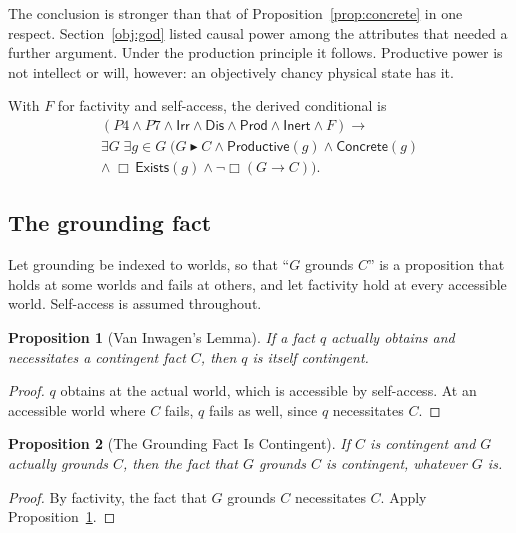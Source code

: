 \documentclass[11pt,letterpaper]{article}
\theoremstyle{plain}
\newtheorem{proposition}{Proposition}
\theoremstyle{definition}
\newcommand{\grounds}{\blacktriangleright}
\begin{document}
The conclusion is stronger than that of Proposition~\ref{prop:concrete} in one respect. Section~\ref{obj:god} listed causal power among the attributes that needed a further argument. Under the production principle it follows. Productive power is not intellect or will, however: an objectively chancy physical state has it.

With $F$ for factivity and self-access, the derived conditional is
\begin{multline*}
  (P4 \land P7 \land \mathsf{Irr} \land \mathsf{Dis} \land \mathsf{Prod} \land \mathsf{Inert} \land F) \rightarrow \\
  \exists G\; \exists g \in G\;\bigl(G \grounds C \land \mathsf{Productive}(g) \land \mathsf{Concrete}(g) \\
  \land\; \Box\,\mathsf{Exists}(g) \land \neg\Box(G \to C)\bigr).
\end{multline*}

\subsection{The grounding fact}
\label{sec:link}

Let grounding be indexed to worlds, so that ``$G$ grounds $C$'' is a proposition that holds at some worlds and fails at others, and let factivity hold at every accessible world. Self-access is assumed throughout.

\begin{proposition}[Van Inwagen's Lemma]\label{prop:vi}
If a fact $q$ actually obtains and necessitates a contingent fact $C$, then $q$ is itself contingent.
\end{proposition}

\begin{proof}
$q$ obtains at the actual world, which is accessible by self-access. At an accessible world where $C$ fails, $q$ fails as well, since $q$ necessitates $C$.
\end{proof}

\begin{proposition}[The Grounding Fact Is Contingent]\label{prop:link}
If $C$ is contingent and $G$ actually grounds $C$, then the fact that $G$ grounds $C$ is contingent, whatever $G$ is.
\end{proposition}

\begin{proof}
By factivity, the fact that $G$ grounds $C$ necessitates $C$. Apply Proposition~\ref{prop:vi}.
\end{proof}
\end{document}
